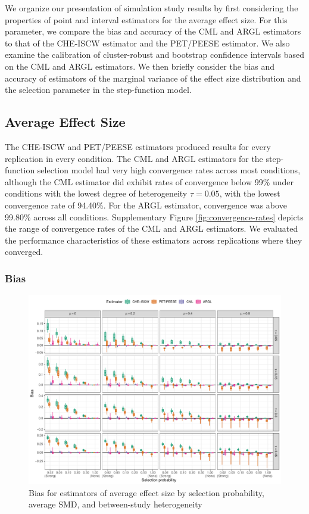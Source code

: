 \documentclass[
  man, donotrepeattitle,floatsintext]{apa7}
\begin{document}
We organize our presentation of simulation study results by first considering the properties of point and interval estimators for the average effect size.
For this parameter, we compare the bias and accuracy of the CML and ARGL estimators to that of the CHE-ISCW estimator and the PET/PEESE estimator.
We also examine the calibration of cluster-robust and bootstrap confidence intervals based on the CML and ARGL estimators.
We then briefly consider the bias and accuracy of estimators of the marginal variance of the effect size distribution and the selection parameter in the step-function model.

\subsection{Average Effect Size}\label{average-effect-size}

The CHE-ISCW and PET/PEESE estimators produced results for every replication in every condition.
The CML and ARGL estimators for the step-function selection model had very high convergence rates across most conditions, although the CML estimator did exhibit rates of convergence below 99\% under conditions with the lowest degree of heterogeneity \(\tau = 0.05\), with the lowest convergence rate of 94.40\%.
For the ARGL estimator, convergence was above 99.80\% across all conditions.
Supplementary Figure \ref{fig:convergence-rates} depicts the range of convergence rates of the CML and ARGL estimators.
We evaluated the performance characteristics of these estimators across replications where they converged.

\subsubsection{Bias}\label{bias}

\begin{figure}
\includegraphics{selection_models_draft_files/figure-latex/mu-bias-1} \caption{Bias for estimators of average effect size by selection probability, average SMD, and between-study heterogeneity}\label{fig:mu-bias}
\end{figure}
\end{document}
